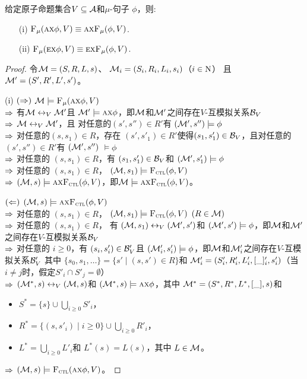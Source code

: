 \begin{proposition}[同质性]\label{chapter06:pro:mu:forget:2}
	给定原子命题集合$V\subseteq\cal A$和$\mu$-句子 $\phi$，则: %
	\begin{itemize}
		\item[(i)] ${\textsc{F}_{\textsc{$\mu$}}}(\textsc{a}\textsc{x}\phi,V)\equiv \textsc{a}\textsc{x} {\textsc{F}_{\textsc{$\mu$}}}(\phi,V)$.
		\item[(ii)] ${\textsc{F}_{\textsc{$\mu$}}}(\textsc{e}\textsc{x}\phi,V)\equiv\textsc{e}\textsc{x} {\textsc{F}_{\textsc{$\mu$}}}(\phi,V)$.
	\end{itemize}
\end{proposition}
\begin{proof}
	令${\cal M}=(S,R, L, s)$、 ${\cal M}_i = (S_i, R_i, L_i, s_i)$（$i \in \textmd{N}$） 且 ${\cal M}'=(S', R', L', s')$。
	
	(i) $(\Rightarrow)$ ${\cal M}\models{\textsc{F}_{\textsc{$\mu$}}}(\textsc{a}\textsc{x}\phi,V)$\\
	$\Rightarrow$ 有${\cal M}\leftrightarrow_V{\cal M}'$且 ${\cal M}'\models \textsc{a}\textsc{x}\phi$，即${\cal M}$和${\cal M}'$之间存在$V$-互模拟关系${\cal B}_V$\\
	$\Rightarrow$  ${\cal M}\leftrightarrow_V {\cal M}'$，且 对任意的$(s',s'')\in R'$有 $({\cal M}', s'')\models \phi$  \\
	$\Rightarrow$ 对任意的$(s,s_1)\in R$，存在 $(s',s'_1)\in R'$使得$(s_1,s_1')\in {\cal B}_V$，且对任意的 $(s',s'')\in R'$有
	$({\cal M}',s'')$ $\models \phi$\\
	$\Rightarrow$ 对任意的 $(s,s_1)\in R$，有 $(s_1,s_1')\in {\cal B}_V$和 $({\cal M}',s'_1)\models\phi$\\
	$\Rightarrow$ 对任意的 $(s,s_1)\in R$， $({\cal M},s_1)\models{\textsc{F}_{\textsc{ctl}}}(\phi,V)$\\
	$\Rightarrow$ $({\cal M},s)\models\textsc{a}\textsc{x}{\textsc{F}_{\textsc{ctl}}}(\phi,V)$，即${\cal M} \models\textsc{a}\textsc{x}{\textsc{F}_{\textsc{ctl}}}(\phi,V)$。
	
	$(\Leftarrow)$ $({\cal M},s)\models\textsc{a}\textsc{x}{\textsc{F}_{\textsc{ctl}}}(\phi,V)$\\
	$\Rightarrow$ 对任意的 $(s,s_1)\in R$， $({\cal M},s_1)\models{\textsc{F}_{\textsc{ctl}}}(\phi,V)$ $(R\in {\cal M})$\\
	$\Rightarrow$ 对任意的 $(s,s_1)\in R$， 有 $({\cal M},s_1)\leftrightarrow_V({\cal M}',s')$和 $({\cal M}',s')\models\phi$，即${\cal M}$和${\cal M}'$之间存在$V$-互模拟关系${\cal B}_V$\\
	$\Rightarrow$ 对任意的 $i\ge 0$，有 $(s_i,s_i') \in {\cal B}_V'$且 $({\cal M}'_i,s'_i)\models\phi$，即${\cal M}$和${\cal M}_i'$之间存在$V$-互模拟关系${\cal B}_V'$
	其中 $\{s_0,s_1,\ldots\}=\{s'\mid (s,s')\in R\}$和 ${\cal M}'_i=(S'_i,R'_i,L'_i,[\_]'_i,s'_i)$（当$i\neq j$时，假定$S'_i\cap S'_j=\emptyset$）\\
	$\Rightarrow$ $({\cal M}^*,s)\leftrightarrow_V({\cal M},s)$和 $({\cal M}^*,s)\models\textsc{a}\textsc{x}\phi$，其中
	${\cal M}^*=(S^*,R^*,L^*,[\_], s)$和
	\begin{itemize}
		\item $S^*=\{s\}\cup\bigcup_{i\ge 0}S'_i$，
		\item $R^*=\{(s,s'_i)\mid i\ge 0\}\cup \bigcup_{i\ge 0} R'_i$，
		\item $L^*=\bigcup_{i\ge 0}L'_i$和 $L^*(s)=L(s)$，其中 $L\in{\cal M}$。
	\end{itemize}
	$\Rightarrow$ $({\cal M},s)\models {\textsc{F}_{\textsc{ctl}}}(\textsc{a}\textsc{x}\phi,V)$。
	

\end{proof}
